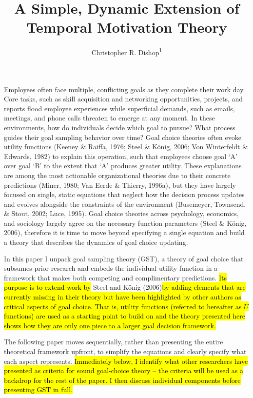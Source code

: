 \documentclass[english,,man]{apa6}
\title{A Simple, Dynamic Extension of Temporal Motivation Theory}
\author{Christopher R. Dishop\textsuperscript{1}}
\date{}
\theoremstyle{definition}
\theoremstyle{definition}
\theoremstyle{definition}
\theoremstyle{remark}
\begin{document}
\maketitle

Employees often face multiple, conflicting goals as they complete their
work day. Core tasks, such as skill acquisition and networking
opportunities, projects, and reports flood employee experiences while
superficial demands, such as emails, meetings, and phone calls threaten
to emerge at any moment. In these environments, how do individuals
decide which goal to pursue? What process guides their goal sampling
behavior over time? Goal choice theories often evoke utility functions
(Keeney \& Raiffa, 1976; Steel \& König, 2006; Von Winterfeldt \&
Edwards, 1982) to explain this operation, such that employees choose
goal `A' over goal `B' to the extent that `A' produces greater utility.
These explanations are among the most actionable organizational theories
due to their concrete predictions (Miner, 1980; Van Eerde \& Thierry,
1996a), but they have largely focused on single, static equations that
neglect how the decision process updates and evolves alongside the
constraints of the environment (Busemeyer, Townsend, \& Stout, 2002;
Luce, 1995). Goal choice theories across psychology, economics, and
sociology largely agree on the necessary function parameters (Steel \&
König, 2006), therefore it is time to move beyond specifying a single
equation and build a theory that describes the dynamics of goal choice
updating.

In this paper I unpack goal sampling theory (GST), a theory of goal
choice that subsumes prior research and embeds the individual utility
function in a framework that makes both competing and complimentary
predictions. \hl{Its purpose is to extend work by }Steel and König
(2006)\hl{by adding elements that are currently missing in their theory but have been highlighted by other authors as critical aspects of goal choice. That is, utility functions (referred to hereafter as $U$ functions) are used as a starting point to build on and the theory presented here shows how they are only one piece to a larger goal decision framework.}

The following paper moves sequentially, rather than presenting the
entire theoretical framework upfront, to simplify the equations and
clearly specify what each aspect represents.
\hl{Immediately below, I identify what other researchers have presented as criteria for sound goal-choice theory -- the criteria will be used as a backdrop for the rest of the paper. I then discuss individual components before presenting GST in full.}
\end{document}
